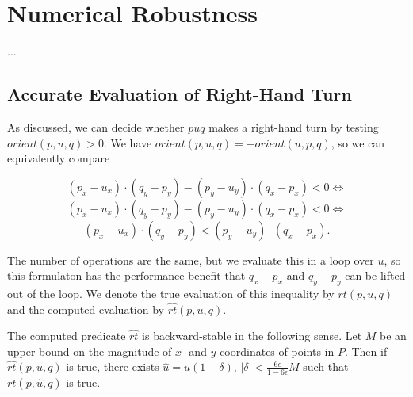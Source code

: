 \section{Numerical Robustness}

...

\subsection{Accurate Evaluation of Right-Hand Turn}

As discussed, we can decide whether $puq$ makes a right-hand turn by testing
$orient(p, u, q) > 0$. We have $orient(p, u, q) = -orient(u, p, q)$, so
we can equivalently compare

$$(p_x - u_x) \cdot (q_y - p_y) - (p_y - u_y) \cdot (q_x - p_x) < 0 \iff$$
$$(p_x - u_x) \cdot (q_y - p_y) - (p_y - u_y) \cdot (q_x - p_x) < 0 \iff$$
$$(p_x - u_x) \cdot (q_y - p_y) < (p_y - u_y) \cdot (q_x - p_x).$$

The number of operations are the same, but we evaluate this in a loop over $u$, 
so this formulaton has the performance benefit that $q_x - p_x$ and $q_y - p_y$ 
can be lifted out of the loop. We denote the true evaluation of this inequality
by $rt(p, u, q)$ and the computed evaluation by $\widehat{rt}(p, u, q)$.


\begin{lemma}\label{lem:right-turn}
    The computed predicate $\widehat{rt}$ is backward-stable in the 
    following sense. Let $M$ be
    an upper bound on the magnitude of $x$- and $y$-coordinates of points in
    $P$. Then if $\widehat{rt}(p, u, q)$ is true, there exists 
    $\hat{u} = u(1 + \delta)$, $|\delta| < \frac{6\epsilon}{1 - 6\epsilon}M$
    such that $rt(p, \hat{u}, q)$ is true.
\end{lemma}

